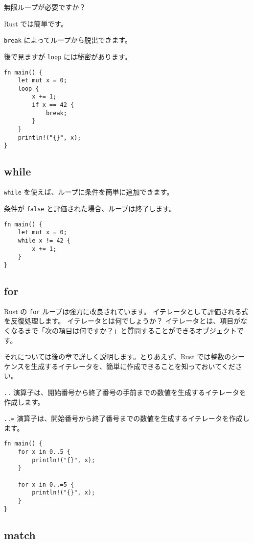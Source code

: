 無限ループが必要ですか？

Rust では簡単です。

\texttt{break} によってループから脱出できます。

後で見ますが \texttt{loop} には秘密があります。

\begin{verbatim}
fn main() {
    let mut x = 0;
    loop {
        x += 1;
        if x == 42 {
            break;
        }
    }
    println!("{}", x);
}
\end{verbatim}

\subsection{while}

\texttt{while} を使えば、ループに条件を簡単に追加できます。

条件が \texttt{false} と評価された場合、ループは終了します。

\begin{verbatim}
fn main() {
    let mut x = 0;
    while x != 42 {
        x += 1;
    }
}
\end{verbatim}

\subsection{for}

Rust の \texttt{for} ループは強力に改良されています。
イテレータとして評価される式を反復処理します。
イテレータとは何でしょうか？
イテレータとは、項目がなくなるまで「次の項目は何ですか？」と質問することができるオブジェクトです。

それについては後の章で詳しく説明します。とりあえず、Rust
では整数のシーケンスを生成するイテレータを、簡単に作成できることを知っておいてください。

\texttt{..}
演算子は、開始番号から終了番号の手前までの数値を生成するイテレータを作成します。

\texttt{..=}
演算子は、開始番号から終了番号までの数値を生成するイテレータを作成します。

\begin{verbatim}
fn main() {
    for x in 0..5 {
        println!("{}", x);
    }

    for x in 0..=5 {
        println!("{}", x);
    }
}
\end{verbatim}

\subsection{match}


